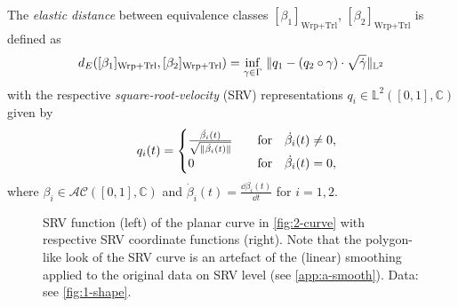 \begin{definition}
  \label{def:2-eldist}
  The \emph{elastic distance} between equivalence classes $[\beta_1]_{\text{Wrp} + \text{Trl}}$, $[\beta_2]_{\text{Wrp} + \text{Trl}}$ is defined as
  \begin{equation}
    \label{eq:2-eldist-def}
    d_{E}([\beta_1]_\text{Wrp+Trl}, [\beta_2]_\text{Wrp+Trl}) = \inf_{\gamma \in \Gamma} \,\, \lVert q_1 - ( q_2 \circ \gamma) \cdot \sqrt{\dot\gamma}\rVert_{\mathbb{L}^2}
  \end{equation}
  with the respective \emph{square-root-velocity} (SRV) representations $q_i \in \mathbb{L}^2([0,1],\mathbb{C})$ given by 
  \begin{equation}
   \quad q_i(t) = 
    \begin{cases}
      \frac{\dot{\beta_i}(t)}{\sqrt{\lVert\dot{\beta_i}(t)\rVert}} & \quad\text{for}\quad\dot{\beta_i}(t) \neq 0, \\
      0 & \quad\text{for}\quad\dot{\beta_i}(t) = 0,
    \end{cases}
  \end{equation}
  where $\beta_i \in \mathcal{AC}([0,1], \mathbb{C})$ and $\dot\beta_i(t) = \frac{\dd\beta_i(t)}{\dd t}$ for $i=1,2$.
\end{definition}

\begin{figure}
  \centering
  \begin{subfigure}{.48\textwidth}
    \centering
  \end{subfigure}\hfill%
  \begin{subfigure}{.48\textwidth}
    \centering
    \begin{subfigure}{\textwidth}
      \centering
    \end{subfigure}
    \begin{subfigure}{\textwidth}
      \centering
    \end{subfigure}
  \end{subfigure}
  \caption{SRV function (left) of the planar curve in \cref{fig:2-curve} with respective SRV coordinate functions (right). Note that the polygon-like look of the SRV curve is an artefact of the (linear) smoothing applied to the original data on SRV level (see \cref{app:a-smooth}). Data: see \cref{fig:1-shape}.}
  \label{fig:2-srv}
\end{figure}

